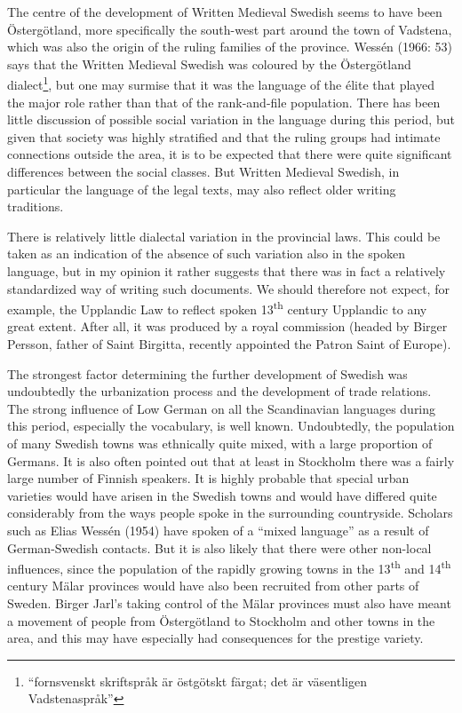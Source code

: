 The centre of the development of Written Medieval Swedish seems to have been Östergötland, more specifically the south-west part around the town of Vadstena, which was also the origin of the ruling families of the province. Wessén (1966: 53) says that the Written Medieval Swedish was coloured by the Östergötland dialect\footnote{ “fornsvenskt skriftspråk är östgötskt färgat; det är väsentligen Vadstenaspråk” }, but one may surmise that it was the language of the élite that played the major role rather than that of the rank-and-file population. There has been little discussion of possible social variation in the language during this period, but given that society was highly stratified and that the ruling groups had intimate connections outside the area, it is to be expected that there were quite significant differences between the social classes. But Written Medieval Swedish, in particular the language of the legal texts, may also reflect older writing traditions.




There is relatively little dialectal variation in the provincial laws. This could be taken as an indication of the absence of such variation also in the spoken language, but in my opinion it rather suggests that there was in fact a relatively standardized way of writing such documents. We should therefore not expect, for example, the Upplandic Law to reflect spoken 13\textsuperscript{th} century Upplandic to any great extent. After all, it was produced by a royal commission (headed by Birger Persson, father of Saint Birgitta, recently appointed the Patron Saint of Europe). 




The strongest factor determining the further development of Swedish was undoubtedly the urbanization process and the development of trade relations. The strong influence of Low German on all the Scandinavian languages during this period, especially the vocabulary, is well known. Undoubtedly, the population of many Swedish towns was ethnically quite mixed, with a large proportion of Germans. It is also often pointed out that at least in Stockholm there was a fairly large number of Finnish speakers. It is highly probable that special urban varieties would have arisen in the Swedish towns and would have differed quite considerably from the ways people spoke in the surrounding countryside. Scholars such as Elias Wessén (1954) have spoken of a “mixed language” as a result of German-Swedish contacts. But it is also likely that there were other non-local influences, since the population of the rapidly growing towns in the 13\textsuperscript{th} and 14\textsuperscript{th} century Mälar provinces would have also been recruited from other parts of Sweden. Birger Jarl’s taking control of the Mälar provinces must also have meant a movement of people from Östergötland to Stockholm and other towns in the area, and this may have especially had consequences for the prestige variety.




